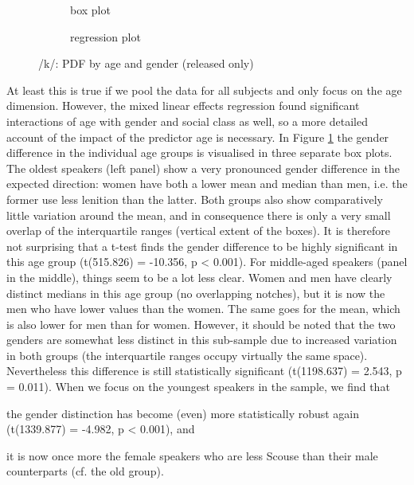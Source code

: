 \begin{figure}[h]
	\centering
	\begin{subfigure}{.49\textwidth}
		\centering
			\resizebox{\linewidth}{!}{} 
		\caption{box plot}
		\label{fig.box.k.agegender}
	\end{subfigure}
	\begin{subfigure}{.49\textwidth}
		\centering
			\resizebox{\linewidth}{!}{}
		\caption{regression plot}
		\label{fig.scatter.k.agegender}
	\end{subfigure}
	\caption{/k/: PDF by age and gender (released only)}
\end{figure}

At least this is true if we pool the data for all subjects and only focus on the age dimension.
However, the mixed linear effects regression found significant interactions of age with gender and social class as well, so a more detailed account of the impact of the predictor age is necessary.
In Figure \ref{fig.box.k.agegender} the gender difference in the individual age groups is visualised in three separate box plots.
The oldest speakers (left panel) show a very pronounced gender difference in the expected direction: women have both a lower mean and median than men, i.e. the former use less lenition than the latter.
Both groups also show comparatively little variation around the mean, and in consequence there is only a very small overlap of the interquartile ranges (vertical extent of the boxes).
It is therefore not surprising that a t-test finds the gender difference to be highly significant in this age group (t(515.826) = -10.356, p < 0.001).
For middle-aged speakers (panel in the middle), things seem to be a lot less clear.
Women and men have clearly distinct medians in this age group (no overlapping notches), but it is now the men who have lower  values than the women.
The same goes for the mean, which is also lower for men than for women.
However, it should be noted that the two genders are somewhat less distinct in this sub-sample due to increased variation in both groups (the interquartile ranges occupy virtually the same space).
Nevertheless this difference is still statistically significant (t(1198.637) = 2.543, p = 0.011).
When we focus on the youngest speakers in the sample, we find that
\begin{inparaenum}[(a)]
	\item the gender distinction has become (even) more statistically robust again (t(1339.877) = -4.982, p < 0.001), and
	\item it is now once more the female speakers who are less Scouse than their male counterparts (cf. the old group).
\end{inparaenum}

